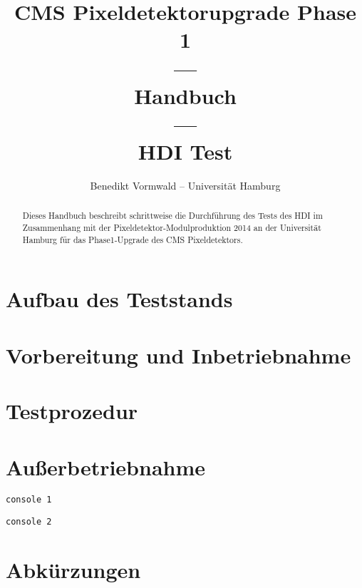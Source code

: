 \documentclass[a4paper,12pt,pointlessnumbers]{scrartcl}
\title{CMS Pixeldetektorupgrade Phase 1\\---\\Handbuch\\---\\HDI Test}
\author{Benedikt Vormwald -- Universit\"{a}t Hamburg}
\begin{document}
\maketitle
\begin{abstract}
Dieses Handbuch beschreibt schrittweise die Durchf\"{u}hrung des Tests des \ac{HDI} im Zusammenhang mit der Pixeldetektor-Modulproduktion 2014 an der Universit\"{a}t Hamburg f\"{u}r das Phase1-Upgrade des CMS Pixeldetektors.
\end{abstract}

\tableofcontents
\newpage

\section{Aufbau des Teststands}
\section{Vorbereitung und Inbetriebnahme}
\section{Testprozedur}
\section{Au{\ss}erbetriebnahme}

\begin{lstlisting}[style=console1]
 console 1
\end{lstlisting}

\begin{lstlisting}[style=console2]
 console 2
\end{lstlisting}

\appendix
\section{Abk\"{u}rzungen}

\begin{acronym}[XXXXX]
\end{acronym}
\end{document}

